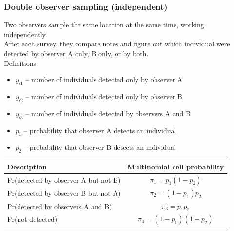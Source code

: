 \documentclass[color=usenames,dvipsnames]{beamer}\usepackage[]{graphicx}\usepackage[]{xcolor}
\begin{document}
\begin{frame}
  \frametitle{Double observer sampling (independent)}
  \small
  Two observers sample the same location at the same time, working independently. \\
  \pause
  \vfill
  After each survey, they compare notes and figure out which
  individual were detected by observer A only, B only, or by both. \\
  \pause
  \vfill
  Definitions
  \begin{itemize}
    \setlength\itemsep{0.5pt}
    \item $y_{i1}$ -- number of individuals detected only by observer A
    \item $y_{i2}$ -- number of individuals detected only by observer B
    \item $y_{i3}$ -- number of individuals detected by observers A and B
    \item $p_1$ -- probability that observer A detects an individual 
    \item $p_2$ -- probability that observer B detects an individual 
  \end{itemize}
  \pause \vfill
  \footnotesize
  \begin{tabular}{lc}
    \hline
    \centering
    Description & Multinomial cell probability \\
    \hline
    Pr(detected by observer A but not B) & $\pi_1 = p_1(1-p_2)$ \\
    Pr(detected by observer B but not A) & $\pi_2 = (1-p_1)p_2$ \\
    Pr(detected by observers A and B) & $\pi_3 = p_1p_2$ \\
    Pr(not detected) & $\pi_4 = (1-p_1)(1-p_2)$ \\
    \hline
  \end{tabular}
\end{frame}
\end{document}

